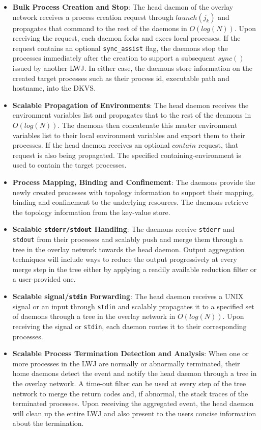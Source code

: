 \begin{itemize}
\item{{\bf Bulk Process Creation and Stop}: The head daemon of the overlay network
receives a process creation request
through $launch(j_k)$ and propagates that command to the rest of the daemons
in $O(log(N))$. Upon receiving the request, each daemon forks and execs
local processes. If the request contains an optional {\tt sync\_assist} flag, the daemons
stop the processes immediately after the creation to support a subsequent $sync()$ issued
by another LWJ. In either case, the daemons store
information on the created target processes such as their process id, executable path
and hostname, into the DKVS.}

\item{{\bf Scalable Propagation of Environments}: The head daemon receives the environment
variables list and propagates that to the rest of the deamons
in $O(log(N))$. The daemons then concatenate this master environment variables
list to their local environment variables and export them to their
processes. If the head daemon receives an optional $contain$ request, that
request is also being propagated. The specified containing-environment is used to contain
the target processes.}

\item{{\bf Process Mapping, Binding and Confinement}: The daemons provide the newly created processes
with topology information to support their mapping, binding and confinement to the underlying 
resources. The daemons retrieve the topology information from the key-value store.}

\item{{\bf Scalable {\tt stderr/stdout} Handling}: The daemons receive
{\tt stderr} and {\tt stdout}
from their processes and scalably push and merge them through a tree in the overlay
network towards the head daemon. Output aggregation techniques
will include ways to reduce the output progressively at every merge step
in the tree either by applying a readily available
reduction filter or a user-provided one.}

\item{{\bf Scalable signal/{\tt stdin} Forwarding}: The head daemon receives a UNIX signal
or an input through {\tt stdin} and scalably propagates it to a specified set of daemons
through a tree in the overlay network in $O(log(N))$. Upon receiving the signal or {\tt stdin},
each daemon routes it to their corresponding processes.}

\item{{\bf Scalable Process Termination Detection and Analysis}: When one or more processes
in the LWJ are normally or abnormally terminated, their home daemons detect the event and notify
the head daemon through a tree in the overlay network. A time-out filter can be used at every step of
the tree network to merge the return codes and, if abnormal, the stack traces of 
the terminated processes. Upon receiving the aggregated
event, the head daemon will clean up the entire LWJ and also present
to the users concise information about the termination.}

\end{itemize}


